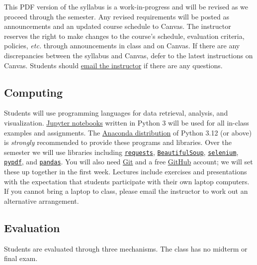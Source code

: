 \documentclass[11pt]{memoir}
\makeatletter
\def\instructoremail{brian.keegan@colorado.edu}
\makeatother
\begin{document}
This PDF version of the syllabus is a work-in-progress and will be revised as we proceed through the semester. Any revised requirements will be posted as announcements and an updated course schedule to Canvas. The instructor reserves the right to make changes to the course's schedule, evaluation criteria, policies, \textit{etc.} through announcements in class and on Canvas. If there are any discrepancies between the syllabus and Canvas, defer to the latest instructions on Canvas. Students should \href{mailto:\instructoremail}{email the instructor} if there are any questions.

\subsection{Computing}
Students will use programming languages for data retrieval, analysis, and visualization. \href{http://jupyter.org/}{Jupyter notebooks} written in Python 3 will be used for all in-class examples and assignments. The \href{https://www.anaconda.com/}{Anaconda distribution} of Python 3.12 (or above) is \textit{strongly} recommended to provide these programs and libraries. Over the semester we will use libraries including \href{https://requests.readthedocs.io/}{\texttt{requests}}, \href{https://www.crummy.com/software/BeautifulSoup/bs4/doc/}{\texttt{BeautifulSoup}}, \href{https://selenium-python.readthedocs.io/}{\texttt{selenium}}, \href{https://pypdf.readthedocs.io/}{\texttt{pypdf}}, and \href{https://pandas.pydata.org/}{\texttt{pandas}}. You will also need \href{https://git-scm.com/}{Git} and a free \href{https://github.com/}{GitHub} account; we will set these up together in the first week. Lectures include exercises and presentations with the expectation that students participate with their own laptop computers. If you cannot bring a laptop to class, please email the instructor to work out an alternative arrangement.

\subsection{Evaluation}
Students are evaluated through three mechanisms. The class has no midterm or final exam.
\end{document}
